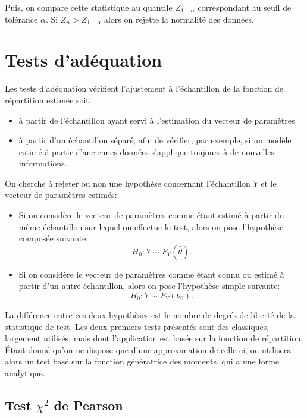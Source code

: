 Puis, on compare cette statistique au quantile $Z_{1-\alpha}$ correspondant
au seuil de tolérance $\alpha$. Si $Z_n>Z_{1-\alpha}$
alors on rejette la normalité des données.

\section{Tests d'adéquation}
\label{sec:testnonparam}

Les tests d'adéquation vérifient l'ajustement à l'échantillon de la
fonction de répartition estimée soit:
\begin{itemize}
\item à partir de l'échantillon ayant servi à l'estimation du vecteur
  de paramètres
\item à partir d'un échantillon séparé, afin de vérifier, par exemple,
  si un modèle estimé à partir d'anciennes données s'applique toujours
  à de nouvelles informations.
\end{itemize}

On cherche à rejeter ou non une hypothèse concernant l'échantillon $Y$
et le vecteur de paramètres estimés:
\begin{itemize}
\item Si on considère le vecteur de paramètres comme étant estimé à
  partir du même échantillon sur lequel on effectue le test, alors on
  pose l'hypothèse composée suivante:
  \begin{equation}
    \label{eq:hypotheseadeqcomp}
    H_0: Y \sim F_Y(\hat\theta).
  \end{equation}
\item Si on considère le vecteur de paramètres comme étant connu ou
  estimé à partir d'un autre échantillon, alors on pose l'hypothèse
  simple suivante:
  \begin{equation}
    \label{eq:hypotheseadeq}
    H_0: Y \sim F_Y(\theta_0).
  \end{equation}
\end{itemize}

La différence entre ces deux hypothèses est le nombre de degrés de
liberté de la statistique de test. Les deux premiers tests présentés
sont des classiques, largement utilisés, mais dont l'application est
basée sur la fonction de répartition. Étant donné qu'on ne dispose que
d'une approximation de celle-ci, on utilisera alors un test basé sur
la fonction génératrice des moments, qui a une forme analytique.

\subsection{Test $\chi^2$ de Pearson}
\label{sec:testchi2}

